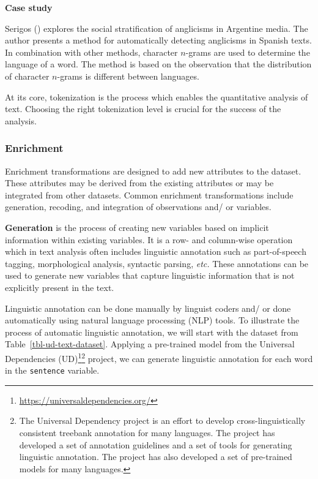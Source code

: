 \documentclass[
  letterpaper,
]{latex/krantz}
\theoremstyle{definition}
\theoremstyle{remark}
\DeclareRobustCommand{\href}[2]{#2\footnote{\url{#1}}}
\begin{document}
\begin{tcolorbox}[enhanced jigsaw, colframe=quarto-callout-color-frame, breakable, bottomrule=.15mm, arc=.35mm, left=2mm, opacityback=0, rightrule=.15mm, colback=white, toprule=.15mm, leftrule=.75mm]

\textbf{ Case study}

Serigos () explores the social
stratification of anglicisms in Argentine media. The author presents a
method for automatically detecting anglicisms in Spanish texts. In
combination with other methods, character \(n\)-grams are used to
determine the language of a word. The method is based on the observation
that the distribution of character \(n\)-grams is different between
languages.

\end{tcolorbox}

At its core, tokenization is the process which enables the quantitative
analysis of text. Choosing the right tokenization level is crucial for
the success of the analysis.

\subsubsection{Enrichment}\label{enrichment}

Enrichment transformations are designed to add new attributes to the
dataset. These attributes may be derived from the existing attributes or
may be integrated from other datasets. Common enrichment transformations
include generation, recoding, and integration of observations and/ or
variables.

\textbf{Generation} is the process of creating new variables based on
implicit information within existing variables. It is a row- and
column-wise operation which in text analysis often includes linguistic
annotation such as part-of-speech tagging, morphological analysis,
syntactic parsing, \emph{etc.} These annotations can be used to generate
new variables that capture linguistic information that is not explicitly
present in the text.

Linguistic annotation can be done manually by linguist coders and/ or
done automatically using natural language processing (NLP) tools. To
illustrate the process of automatic linguistic annotation, we will start
with the dataset from Table~\ref{tbl-ud-text-dataset}. Applying a
pre-trained model from the
\href{https://universaldependencies.org/}{Universal Dependencies
(UD)}\footnote{The Universal Dependency project is an effort to develop
  cross-linguistically consistent treebank annotation for many
  languages. The project has developed a set of annotation guidelines
  and a set of tools for generating linguistic annotation. The project
  has also developed a set of pre-trained models for many languages.}
project, we can generate linguistic annotation for each word in the
\texttt{sentence} variable.
\end{document}

